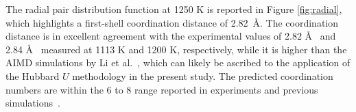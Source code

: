 \documentclass[preprint,3p,10pt,onecolumn,number,sort&compress]{elsarticle}
\begin{document}
 
 
The radial pair distribution function at 1250 K is reported in Figure \ref{fig:radial}, which highlights a first-shell coordination distance of 2.82~\AA. The coordination distance is in excellent agreement with the experimental values of 2.82 \AA~\cite{Neilson} and 2.84 \AA~\cite{Okamoto} measured at 1113 K and 1200 K, respectively, while it is higher than the AIMD simulations by Li et al.~\cite{Li}, which can likely be ascribed to the application of the Hubbard $U$ methodology in the present study. The predicted coordination numbers are within the 6 to 8 range reported in experiments and previous simulations~\cite{Li,Neilson,Okamoto}. %
 
\end{document}
